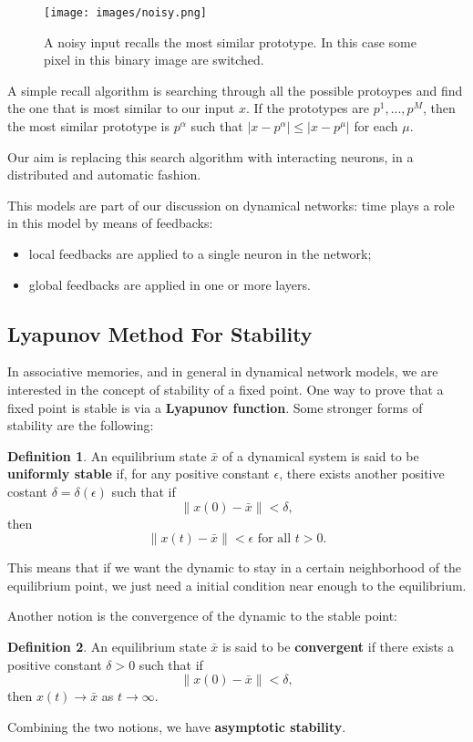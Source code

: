 \documentclass[oneside]{book}
\theoremstyle{definition}
\newtheorem{defn}{Definition}
\theoremstyle{plain}
\begin{document}
\begin{figure}
    \centering
    \texttt{[image: images/noisy.png]}
    \caption{A noisy input recalls the most similar prototype. In this case some pixel in this binary image are switched.}
    \label{fig:noisy}
\end{figure}
A simple recall algorithm is searching through all the possible protoypes and find the one that is most similar to our input $x$. If the prototypes are $p^1,...,p^M$, then the most similar prototype is $p^\alpha$ such that $|x- p^\alpha|\leq |x-p^\mu|$ for each $\mu$.

Our aim is replacing this search algorithm with interacting neurons, in a distributed and automatic fashion.

This models are part of our discussion on dynamical networks: time plays a role in this model by means of feedbacks: 
\begin{itemize}
    \item local feedbacks are applied to a single neuron in the network;
    \item global feedbacks are applied in one or more layers.
\end{itemize}

\subsection{Lyapunov Method For Stability}
In associative memories, and in general in dynamical network models, we are interested in the concept of stability of a fixed point. One way to prove that a fixed point is stable is via a \textbf{Lyapunov function}.
Some stronger forms of stability are the following:
\begin{defn}
    An equilibrium state $\bar{x}$ of a dynamical system is said to be \textbf{uniformly stable} if, for any positive constant $\epsilon$, there exists another positive costant $\delta=\delta(\epsilon)$ such that if
    \[
    \|x(0)-\bar{x}\|< \delta,
    \]
    then 
    \[
        \|x(t)-\bar x\|<\epsilon \text{ for all } t>0.
    \]
    
\end{defn}
This means that if we want the dynamic to stay in a certain neighborhood of the equilibrium point, we just need a initial condition near enough to the equilibrium.

Another notion is the convergence of the dynamic to the stable point:
\begin{defn}
    An equilibrium state $\bar x$ is said to be \textbf{convergent} if there exists a positive constant $\delta>0$ such that if
    \[
    \|x(0)-\bar x\|<\delta,
    \]
    then $x(t)\to\bar x$ as $t\to \infty$.
\end{defn}
Combining the two notions, we have \textbf{asymptotic stability}.
\end{document}
